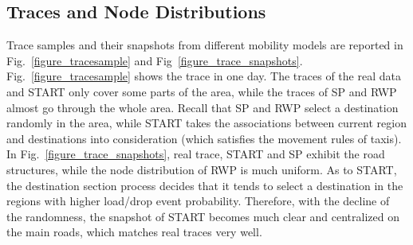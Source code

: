 \subsection{Traces and Node Distributions}

Trace samples and their snapshots from different mobility models are reported in Fig.~\ref{figure_tracesample} and Fig~\ref{figure_trace_snapshots}. Fig.~\ref{figure_tracesample} shows the trace in one day. The traces of the real data and START only cover some parts of the area, while the traces of SP and RWP almost go through the whole area. Recall that SP and RWP select a destination randomly in the area, while START takes the associations between current region and destinations into consideration (which satisfies the movement rules of taxis). In Fig.~\ref{figure_trace_snapshots}, real trace, START and SP exhibit the road structures, while the node distribution of RWP is much uniform. As to START, the destination section process decides that it tends to select a destination in the regions with higher load/drop event probability. Therefore, with the decline of the randomness, the snapshot of START becomes much clear and centralized on the main roads, which matches real traces very well.



